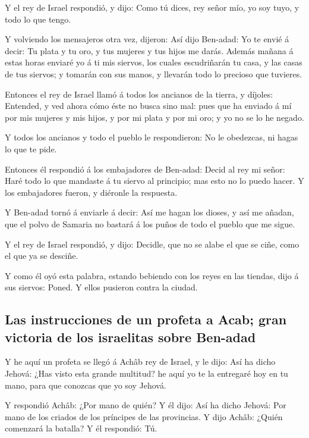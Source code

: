  Y el rey de Israel respondió, y dijo: Como tú dices, rey
señor mío, yo soy tuyo, y todo lo que tengo.

 Y volviendo los mensajeros otra vez, dijeron: Así dijo
Ben-adad: Yo te envié á decir: Tu plata y tu oro, y tus mujeres y tus
hijos me darás.  Además mañana á estas horas enviaré yo á ti
mis siervos, los cuales escudriñarán tu casa, y las casas de tus
siervos; y tomarán con sus manos, y llevarán todo lo precioso que
tuvieres.

 Entonces el rey de Israel llamó á todos los ancianos de la
tierra, y díjoles: Entended, y ved ahora cómo éste no busca sino mal:
pues que ha enviado á mí por mis mujeres y mis hijos, y por mi plata y
por mi oro; y yo no se lo he negado.

 Y todos los ancianos y todo el pueblo le respondieron: No
le obedezcas, ni hagas lo que te pide.

 Entonces él respondió á los embajadores de Ben-adad: Decid
al rey mi señor: Haré todo lo que mandaste á tu siervo al principio; mas
esto no lo puedo hacer. Y los embajadores fueron, y diéronle la
respuesta.

 Y Ben-adad tornó á enviarle á decir: Así me hagan los
dioses, y así me añadan, que el polvo de Samaria no bastará á los puños
de todo el pueblo que me sigue.

 Y el rey de Israel respondió, y dijo: Decidle, que no se
alabe el que se ciñe, como el que ya se desciñe.

 Y como él oyó esta palabra, estando bebiendo con los reyes
en las tiendas, dijo á sus siervos: Poned. Y ellos pusieron contra la
ciudad.

\hypertarget{las-instrucciones-de-un-profeta-a-acab-gran-victoria-de-los-israelitas-sobre-ben-adad}{%
\subsection{Las instrucciones de un profeta a Acab; gran victoria de los
israelitas sobre
Ben-adad}\label{las-instrucciones-de-un-profeta-a-acab-gran-victoria-de-los-israelitas-sobre-ben-adad}}

 Y he aquí un profeta se llegó á Achâb rey de Israel, y le
dijo: Así ha dicho Jehová: ¿Has visto esta grande multitud? he aquí yo
te la entregaré hoy en tu mano, para que conozcas que yo soy Jehová.

 Y respondió Achâb: ¿Por mano de quién? Y él dijo: Así ha
dicho Jehová: Por mano de los criados de los príncipes de las
provincias. Y dijo Achâb: ¿Quién comenzará la batalla? Y él respondió:
Tú.

